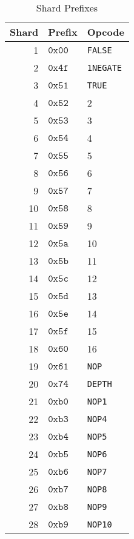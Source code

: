\begin{table} \center
  \caption{Shard Prefixes}
  \label{shardprefix}
  \begin{tabular}{r l l}
    \toprule
    Shard & Prefix & Opcode\\
    \midrule
    1   &  $\mathtt{0x00}$  &  {\tt FALSE}\\
    2   &  $\mathtt{0x4f}$  &  {\tt 1NEGATE}\\
    3   &  $\mathtt{0x51}$  &  {\tt TRUE}\\
    4   &  $\mathtt{0x52}$  &  \num{2}\\
    5   &  $\mathtt{0x53}$  &  \num{3}\\
    6   &  $\mathtt{0x54}$  &  \num{4}\\
    7   &  $\mathtt{0x55}$  &  \num{5}\\
    8   &  $\mathtt{0x56}$  &  \num{6}\\
    9   &  $\mathtt{0x57}$  &  \num{7}\\
    10  &  $\mathtt{0x58}$  &  \num{8}\\
    11  &  $\mathtt{0x59}$  &  \num{9}\\
    12  &  $\mathtt{0x5a}$  &  \num{10}\\
    13  &  $\mathtt{0x5b}$  &  \num{11}\\
    14  &  $\mathtt{0x5c}$  &  \num{12}\\
    15  &  $\mathtt{0x5d}$  &  \num{13}\\
    16  &  $\mathtt{0x5e}$  &  \num{14}\\
    17  &  $\mathtt{0x5f}$  &  \num{15}\\
    18  &  $\mathtt{0x60}$  &  \num{16}\\
    19  &  $\mathtt{0x61}$  &  {\tt NOP}\\
    20  &  $\mathtt{0x74}$  &  {\tt DEPTH}\\
    21  &  $\mathtt{0xb0}$  &  {\tt NOP1}\\
    22  &  $\mathtt{0xb3}$  &  {\tt NOP4}\footnotemark\\
    23  &  $\mathtt{0xb4}$  &  {\tt NOP5}\\
    24  &  $\mathtt{0xb5}$  &  {\tt NOP6}\\
    25  &  $\mathtt{0xb6}$  &  {\tt NOP7}\\
    26  &  $\mathtt{0xb7}$  &  {\tt NOP8}\\
    27  &  $\mathtt{0xb8}$  &  {\tt NOP9}\\
    28  &  $\mathtt{0xb9}$  &  {\tt NOP10}\\
    \bottomrule
  \end{tabular}
\end{table}

